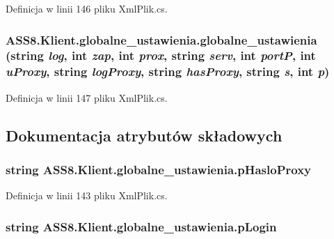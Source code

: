 Definicja w linii 146 pliku XmlPlik.cs.\hypertarget{a00006_f9fcc3d7f2fcb1db3992ff5598f0f5c2}{
\subsubsection[{globalne\_\-ustawienia}]{\setlength{\rightskip}{0pt plus 5cm}ASS8.Klient.globalne\_\-ustawienia.globalne\_\-ustawienia (string {\em log}, \/  int {\em zap}, \/  int {\em prox}, \/  string {\em serv}, \/  int {\em portP}, \/  int {\em uProxy}, \/  string {\em logProxy}, \/  string {\em hasProxy}, \/  string {\em s}, \/  int {\em p})}}
\label{de/d21/a00006_f9fcc3d7f2fcb1db3992ff5598f0f5c2}




Definicja w linii 147 pliku XmlPlik.cs.

\subsection{Dokumentacja atrybutów składowych}
\hypertarget{a00006_2b018bb4bb880ffcf042cfebb2b4cc2d}{
\subsubsection[{pHasloProxy}]{\setlength{\rightskip}{0pt plus 5cm}string {\bf ASS8.Klient.globalne\_\-ustawienia.pHasloProxy}}}
\label{de/d21/a00006_2b018bb4bb880ffcf042cfebb2b4cc2d}




Definicja w linii 143 pliku XmlPlik.cs.\hypertarget{a00006_718e259a83e902c51ffc2e742ae8b371}{
\subsubsection[{pLogin}]{\setlength{\rightskip}{0pt plus 5cm}string {\bf ASS8.Klient.globalne\_\-ustawienia.pLogin}}}
\label{de/d21/a00006_718e259a83e902c51ffc2e742ae8b371}




